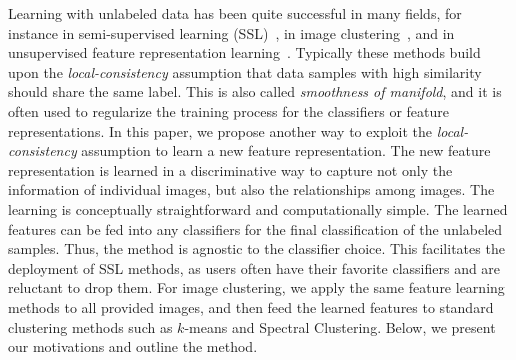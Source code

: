 \documentclass[preprint,12pt,3p]{elsarticle}
\begin{document}
Learning with unlabeled data has been quite successful in many fields, for instance in semi-supervised learning 
(SSL)~\citep{Zhou:nips:04, deep:semi:embedding, Fergus09, SemiForest, Zhu:ISL:2009, 
nips14:ssl}, in image clustering~\cite{Grauman06, Frey_AffinityPropagation, dai}, and in 
unsupervised feature representation learning~\cite{stl-10, cnnfet14, feature:LSTM, feature:video}. 
Typically these methods build upon the
\emph{local-consistency} assumption that data samples with high
similarity should share the same label. This is also called
\emph{smoothness of manifold}, and it is often used to regularize the training process for the classifiers or feature
 representations.  
In this paper, we propose another way to exploit the \emph{local-consistency} assumption to 
learn a new feature representation. 
The new feature
representation is learned in a discriminative way to capture not only
the information of individual images, but also the relationships among
images. The learning is conceptually straightforward and
computationally simple. The learned features can be fed into any
classifiers for the final classification of the unlabeled samples.
Thus, the method is agnostic to the classifier choice. This facilitates the
deployment of SSL methods, as users often have their favorite
classifiers and are reluctant to drop them. For image clustering, we
apply the same feature learning methods to all provided images, and
then feed the learned features to standard clustering methods such as
$k$-means and Spectral Clustering.  Below, we present our motivations
and outline the method.
\end{document}
